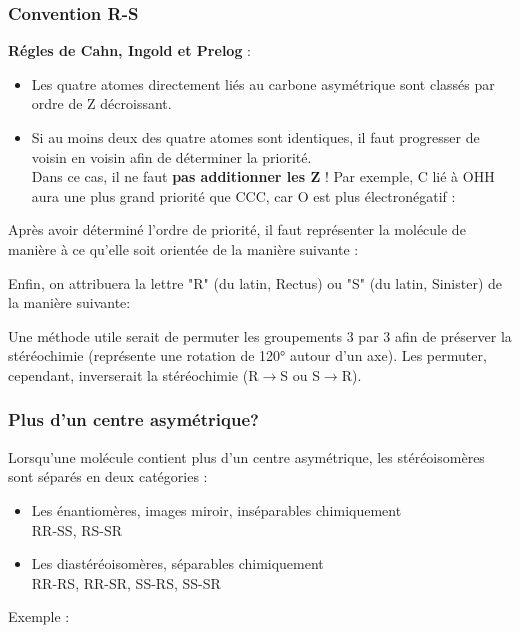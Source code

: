 \documentclass{article}
\newcommand{\insertslide}[2]{
\begin{center}
    \fbox{\texttt{[image: \#1]}}
\end{center}
}
\begin{document}
        \subsubsection{Convention R-S}
            \textbf{Régles de Cahn, Ingold et Prelog} :
            \begin{itemize}
                \item Les quatre atomes directement liés au carbone
                asymétrique sont classés par ordre de Z décroissant.
                \item Si au moins deux des quatre atomes sont identiques,
                il faut progresser de voisin en voisin afin de déterminer
                la priorité.\\
                Dans ce cas, il ne faut \textbf{pas additionner les Z} !
                Par exemple, C lié à OHH aura une plus grand priorité que CCC,
                car O est plus électronégatif :
                \insertslide{Slides/CM2.pdf}{22}
            \end{itemize}
            Après avoir déterminé l'ordre de priorité, il faut représenter
            la molécule de manière à ce qu'elle soit orientée de la manière
            suivante :
            \insertslide{Slides/CM2.pdf}{24}
\pagebreak
            Enfin, on attribuera la lettre "R" (du latin, Rectus) ou "S" (du latin, Sinister)
            de la manière suivante:
            \insertslide{Slides/CM2.pdf}{25}
            Une méthode utile serait de permuter les groupements 3 par 3 
            afin de préserver la stéréochimie (représente une rotation de 120°
            autour d'un axe).
            Les permuter, cependant, inverserait la stéréochimie (R$\rightarrow$S ou S$\rightarrow$R).
        
        \subsubsection{Plus d'un centre asymétrique?}
            Lorsqu'une molécule contient plus d'un centre asymétrique, les 
            stéréoisomères sont séparés en deux catégories :
            \begin{itemize}
                \item Les énantiomères, images miroir, inséparables chimiquement\\
                RR-SS, RS-SR 
                \item Les diastéréoisomères, séparables chimiquement\\
                RR-RS, RR-SR, SS-RS, SS-SR
            \end{itemize}
            Exemple :
            \insertslide{Slides/CM2.pdf}{27}
            \insertslide{Slides/CM2.pdf}{28}
        
\end{document}

